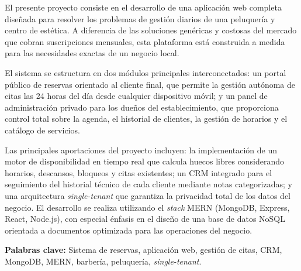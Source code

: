 
El presente proyecto consiste en el desarrollo de una aplicaci\'on web completa dise\~nada para resolver los problemas de gesti\'on diarios de una peluquer\'ia y centro de est\'etica. A diferencia de las soluciones gen\'ericas y costosas del mercado que cobran suscripciones mensuales, esta plataforma est\'a construida a medida para las necesidades exactas de un negocio local.

El sistema se estructura en dos m\'odulos principales interconectados: un portal p\'ublico de reservas orientado al cliente final, que permite la gesti\'on aut\'onoma de citas las 24 horas del d\'ia desde cualquier dispositivo m\'ovil; y un panel de administraci\'on privado para los due\~nos del establecimiento, que proporciona control total sobre la agenda, el historial de clientes, la gesti\'on de horarios y el cat\'alogo de servicios.

Las principales aportaciones del proyecto incluyen: la implementaci\'on de un motor de disponibilidad en tiempo real que calcula huecos libres considerando horarios, descansos, bloqueos y citas existentes; un CRM integrado para el seguimiento del historial t\'ecnico de cada cliente mediante notas categorizadas; y una arquitectura \textit{single-tenant} que garantiza la privacidad total de los datos del negocio. El desarrollo se realiza utilizando el \textit{stack} MERN (MongoDB, Express, React, Node.js), con especial \'enfasis en el dise\~no de una base de datos NoSQL orientada a documentos optimizada para las operaciones del negocio.

\vspace{1cm}

\textbf{Palabras clave:} Sistema de reservas, aplicaci\'on web, gesti\'on de citas, CRM, MongoDB, MERN, barber\'ia, peluquer\'ia, \textit{single-tenant}.

